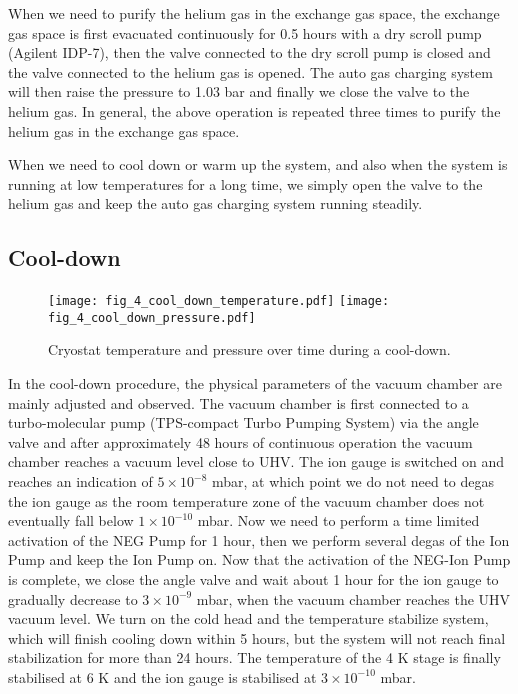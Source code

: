When we need to purify the helium gas in the exchange gas space, the exchange gas space is first evacuated continuously for 0.5 hours with a dry scroll pump (Agilent IDP-7), then the valve connected to the dry scroll pump is closed and the valve connected to the helium gas is opened. The auto gas charging system will then raise the pressure to 1.03 bar and finally we close the valve to the helium gas. In general, the above operation is repeated three times to purify the helium gas in the exchange gas space.

When we need to cool down or warm up the system, and also when the system is running at low temperatures for a long time, we simply open the valve to the helium gas and keep the auto gas charging system running steadily.

\subsection{Cool-down}

\begin{figure}
    \centering
    {\texttt{[image: fig\_4\_cool\_down\_temperature.pdf]}}
    {\texttt{[image: fig\_4\_cool\_down\_pressure.pdf]}}
    \caption{Cryostat temperature and pressure over time during a cool-down.}
\end{figure}

In the cool-down procedure, the physical parameters of the vacuum chamber are mainly adjusted and observed. The vacuum chamber is first connected to a turbo-molecular pump (TPS-compact Turbo Pumping System) via the angle valve and after approximately 48 hours of continuous operation the vacuum chamber reaches a vacuum level close to UHV. The ion gauge is switched on and reaches an indication of $5 \times {10}^{-8}$ mbar, at which point we do not need to degas the ion gauge as the room temperature zone of the vacuum chamber does not eventually fall below $1 \times {10}^{-10}$ mbar. Now we need to perform a time limited activation of the NEG Pump for 1 hour, then we perform several degas of the Ion Pump and keep the Ion Pump on. Now that the activation of the NEG-Ion Pump is complete, we close the angle valve and wait about 1 hour for the ion gauge to gradually decrease to $3 \times {10}^{-9}$ mbar, when the vacuum chamber reaches the UHV vacuum level. We turn on the cold head and the temperature stabilize system, which will finish cooling down within 5 hours, but the system will not reach final stabilization for more than 24 hours. The temperature of the 4 K stage is finally stabilised at 6 K and the ion gauge is stabilised at $3 \times {10}^{-10}$ mbar.

